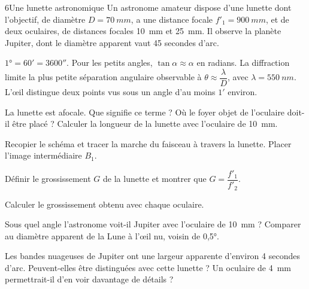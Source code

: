 \begin{exoBac}{6}{Une lunette astronomique}
Un astronome amateur dispose d'une lunette dont l'objectif, de diamètre $D=\qty{70}{mm}$, a une distance focale
$f'_1=\qty{900}{mm}$, et de deux oculaires, de distances focales \qty{10}{mm} et \qty{25}{mm}. Il observe la planète Jupiter, dont le diamètre
apparent vaut 45 secondes d'arc.
\begin{donnees}
$\ang{1}=60'=3600''$. Pour les petits angles, $\tan\alpha\approx\alpha$ en radians. La diffraction limite la plus petite séparation angulaire
observable à $\theta\approx\dfrac{\lambda}{D}$, avec $\lambda=\qty{550}{nm}$. L'œil distingue deux points vus sous un angle d'au moins $1'$ environ.
\end{donnees}
\begin{questions}
\item La lunette est afocale. Que signifie ce terme ? Où le foyer objet de l'oculaire doit-il être placé ? Calculer la
longueur de la lunette avec l'oculaire de \qty{10}{mm}.
\item Recopier le schéma et tracer la marche du faisceau à travers la lunette. Placer l'image intermédiaire $B_1$.
\item Définir le grossissement $G$ de la lunette et montrer que $G=\dfrac{f'_1}{f'_2}$.
\item Calculer le grossissement obtenu avec chaque oculaire.
\item Sous quel angle l'astronome voit-il Jupiter avec l'oculaire de \qty{10}{mm} ? Comparer au diamètre apparent de la Lune à l'œil nu,
voisin de \ang{0,5}.
\item \initiative Les bandes nuageuses de Jupiter ont une largeur apparente d'environ 4 secondes d'arc. Peuvent-elles être
distinguées avec cette lunette ? Un oculaire de \qty{4}{mm} permettrait-il d'en voir davantage de détails ?
\end{questions}
\end{exoBac}

